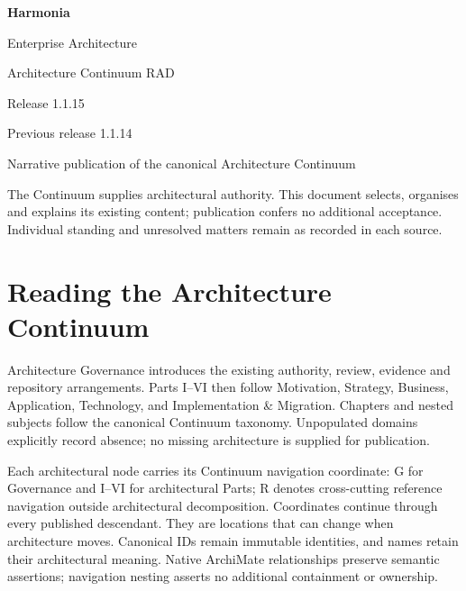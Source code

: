 \documentclass[10pt,a4paper,oneside,headings=small]{scrreprt}
\begin{document}
\hypersetup{pageanchor=false}
\begin{titlepage}
\vspace*{24mm}
{\Huge\bfseries\color{Ink} Harmonia\par}
\vspace{8mm}
{\LARGE Enterprise Architecture\par Architecture Continuum RAD\par}
\vspace{12mm}
{\Large Release 1.1.15\par Previous release 1.1.14\par}
\vfill
Narrative publication of the canonical Architecture Continuum\par
\vspace{8mm}
The Continuum supplies architectural authority. This document selects, organises
and explains its existing content; publication confers no additional acceptance.
Individual standing and unresolved matters remain as recorded in each source.
\end{titlepage}
\hypersetup{pageanchor=true}
\tableofcontents
\chapter*{Reading the Architecture Continuum}
Architecture Governance introduces the existing authority, review, evidence and
repository arrangements. Parts I--VI then follow Motivation, Strategy, Business,
Application, Technology, and Implementation \& Migration. Chapters and nested
subjects follow the canonical Continuum taxonomy. Unpopulated domains explicitly
record absence; no missing architecture is supplied for publication.

Each architectural node carries its Continuum navigation coordinate: G for
Governance and I--VI for architectural Parts; R denotes cross-cutting reference
navigation outside architectural decomposition. Coordinates continue through every
published descendant. They are locations that can change when architecture moves.
Canonical IDs remain immutable identities, and names retain their architectural
meaning. Native ArchiMate relationships preserve semantic assertions; navigation
nesting asserts no additional containment or ownership.
\end{document}
